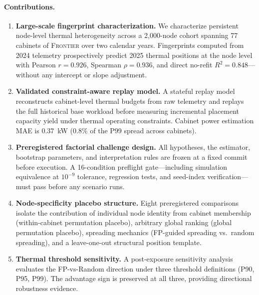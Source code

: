 \documentclass[acmsmall,screen,review,anonymous]{acmart}
\newcommand{\Frontier}{\textsc{Frontier}\xspace}
\begin{document}
\paragraph{Contributions.}
\begin{enumerate}
  \item \textbf{Large-scale fingerprint characterization.}  We characterize persistent
    node-level thermal heterogeneity across a 2,000-node cohort spanning 77 cabinets of
    \Frontier over two calendar years.  Fingerprints computed from 2024 telemetry
    prospectively predict 2025 thermal positions at the node level with Pearson $r = 0.926$,
    Spearman $\rho = 0.936$, and direct no-refit $R^2 = 0.848$---without any intercept or
    slope adjustment.

  \item \textbf{Validated constraint-aware replay model.}  A stateful replay model
    reconstructs cabinet-level thermal budgets from raw telemetry and replays the full
    historical base workload before measuring incremental placement capacity yield under
    thermal operating constraints.  Cabinet power estimation MAE is \SI{0.37}{\kilo\watt}
    (0.8\% of the P99 spread across cabinets).

  \item \textbf{Preregistered factorial challenge design.}  All hypotheses, the estimator,
    bootstrap parameters, and interpretation rules are frozen at a fixed commit before
    execution.  A 16-condition preflight gate---including simulation equivalence at
    $10^{-9}$ tolerance, regression tests, and seed-index verification---must pass before
    any scenario runs.

  \item \textbf{Node-specificity placebo structure.}  Eight preregistered comparisons
    isolate the contribution of individual node identity from cabinet membership
    (within-cabinet permutation placebo), arbitrary global ranking (global permutation
    placebo), spreading mechanics (FP-guided spreading vs.\ random spreading), and a
    leave-one-out structural position template.

  \item \textbf{Thermal threshold sensitivity.}  A post-exposure sensitivity analysis
    evaluates the FP-vs-Random direction under three threshold definitions (P90, P95,
    P99).  The advantage sign is preserved at all three, providing directional robustness
    evidence.
\end{enumerate}
\end{document}
